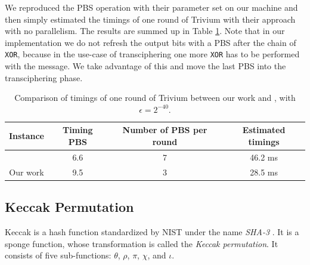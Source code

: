 We reproduced the PBS operation with their parameter set on our machine and then simply estimated the timings of one round of Trivium with their approach with no parallelism. The results are summed up in Table \ref{tab:perfs_trivium}. Note that in our implementation we do not refresh the output bits with a PBS after the chain of \texttt{XOR}, because in the use-case of transciphering one more \texttt{XOR} has to be performed with the message. We take advantage of this and move the last PBS into the transciphering phase.

\begin{table}[htbp]
\centering
\caption{Comparison of timings of one round of Trivium between our work and \cite{DBLP:conf/wahc/BalenboisOS23}, with $\epsilon=2^{-40}$.}
\label{tab:perfs_trivium}
\begin{tabular}{|c|c|c|c|}
\hline
Instance & Timing PBS & Number of PBS per round & Estimated timings \\
\hline
\cite{DBLP:conf/wahc/BalenboisOS23} & 6.6 & 7 & 46.2 ms \\
\hline
Our work & 9.5 & 3 & 28.5 ms \\
\hline
\end{tabular}
\end{table}

\subsection{Keccak Permutation}
\label{sec:keccak}

Keccak is a hash function standardized by NIST under the name \emph{SHA-3} \cite{sha-3}. It is a sponge function, whose transformation is called the \emph{Keccak permutation}. It consists of five sub-functions: $\theta$, $\rho$, $\pi$, $\chi$, and $\iota$.

